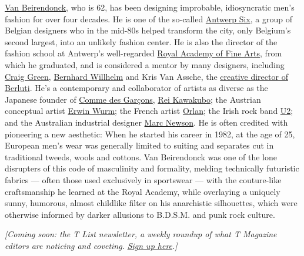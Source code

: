 \href{http://www.waltervanbeirendonck.com/}{Van Beirendonck}, who is 62,
has been designing improbable, idiosyncratic men's fashion for over four
decades. He is one of the so-called
\href{https://www.nytimes3xbfgragh.onion/2013/06/18/fashion/a-rare-reunion-for-the-antwerp-six.html}{Antwerp
Six}, a group of Belgian designers who in the mid-80s helped transform
the city, only Belgium's second largest, into an unlikely fashion
center. He is also the director of the fashion school at Antwerp's
well-regarded
\href{https://www.ap.be/en/royal-academy-fine-arts-antwerp}{Royal
Academy of Fine Arts}, from which he graduated, and is considered a
mentor by many designers, including
\href{https://www.nytimes3xbfgragh.onion/2019/01/09/t-magazine/craig-green-mens-fashion-week.html}{Craig
Green},
\href{https://www.nytimes3xbfgragh.onion/2015/06/29/t-magazine/a-paris-designer-sets-up-a-creative-commune-in-the-hollywood-hills.html}{Bernhard
Willhelm} and Kris Van Assche, the
\href{https://www.nytimes3xbfgragh.onion/2018/04/03/fashion/berluti-kris-van-assche-lvmh.html}{creative
director of Berluti}. He's a contemporary and collaborator of artists as
diverse as the Japanese founder of
\href{https://www.nytimes3xbfgragh.onion/2018/09/03/t-magazine/rei-kawakubo-comme-des-garcons-menswear.html}{Comme
des Garçons},
\href{https://www.nytimes3xbfgragh.onion/topic/person/rei-kawakubo}{Rei
Kawakubo}; the Austrian conceptual artist
\href{https://www.nytimes3xbfgragh.onion/2014/03/09/t-magazine/erwin-wurm-shape-shifter.html}{Erwin
Wurm}; the French artist
\href{https://www.nytimes3xbfgragh.onion/1993/11/21/style/a-portrait-in-skin-and-bone.html}{Orlan};
the Irish rock band
\href{https://www.nytimes3xbfgragh.onion/topic/organization/u2}{U2}; and
the Australian industrial designer
\href{https://www.nytimes3xbfgragh.onion/2010/03/14/t-magazine/02well-newsonhouse.html}{Marc
Newson}. He is often credited with pioneering a new aesthetic: When he
started his career in 1982, at the age of 25, European men's wear was
generally limited to suiting and separates cut in traditional tweeds,
wools and cottons. Van Beirendonck was one of the lone disrupters of
this code of masculinity and formality, melding technically futuristic
fabrics --- often those used exclusively in sportswear --- with the
couture-like craftsmanship he learned at the Royal Academy, while
overlaying a uniquely sunny, humorous, almost childlike filter on his
anarchistic silhouettes, which were otherwise informed by darker
allusions to B.D.S.M. and punk rock culture.

\emph{{[}Coming soon: the T List newsletter, a weekly roundup of what T
Magazine editors are noticing and coveting.}
\href{https://www.nytimes3xbfgragh.onion/newsletters/t-list?module=inline}{\emph{Sign
up here}}\emph{.{]}}

